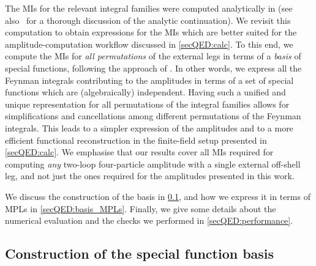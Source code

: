 \documentclass[main.tex]{subfiles}
\begin{document}
The \acp{MI} for the relevant integral families were computed analytically in  (see also~ for a thorough discussion of the analytic continuation).
We revisit this computation to obtain expressions for the \acp{MI} which are better suited for the amplitude-computation workflow discussed in \cref{secQED:calc}. To this end, we compute the \acp{MI} for \emph{all permutations} of the external legs in terms of a \emph{basis} of special functions, following the approach of .
In other words, we express all the Feynman integrals contributing to the amplitudes in terms of a set of special functions which are (algebraically) independent.
Having such a unified and unique representation for all permutations of the integral families allows for simplifications and cancellations among different permutations of the Feynman integrals.
This leads to a simpler expression of the amplitudes and to a more efficient functional reconstruction in the finite-field setup presented in \cref{secQED:calc}. 
We emphasise that our results cover all \acp{MI} required for computing \emph{any} two-loop four-particle amplitude with a single external off-shell leg, and not just the ones required for the amplitudes presented in this work.

We discuss the construction of the basis in \cref{secQED:basis_construction}, and how we express it in terms of \acfp{MPL} in \cref{secQED:basis_MPLs}. 
Finally, we give some details about the numerical evaluation and the checks we performed in \cref{secQED:performance}.


\subsection{Construction of the special function basis}
\label{secQED:basis_construction}
\end{document}
